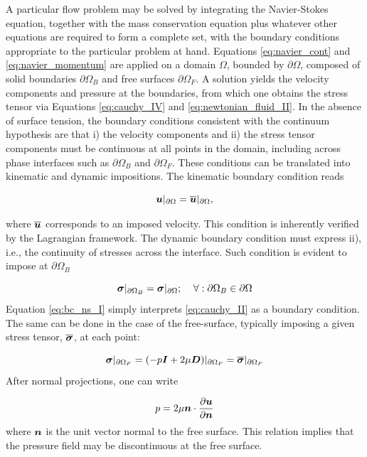 A particular flow problem may be solved by integrating the Navier-Stokes equation, together with the mass conservation equation plus whatever other equations are required to form a complete set, with the boundary conditions appropriate to the particular problem at hand. Equations \eqref{eq:navier_cont} and \eqref{eq:navier_momentum} are applied on a domain $\Omega$, bounded by $\partial\Omega$, composed of solid boundaries $\partial\Omega_B$ and free surfaces $\partial\Omega_F$. A solution yields the velocity components and pressure at the boundaries, from which one obtains the stress tensor via Equations \eqref{eq:cauchy_IV} and \eqref{eq:newtonian_fluid_II}.
In the absence of surface tension, the boundary conditions consistent with the continuum hypothesis are that i) the velocity components and ii) the stress tensor components must be continuous at all points in the domain, including across phase interfaces such as $\partial\Omega_B$ and $\partial\Omega_F$. These conditions can be translated into kinematic and dynamic impositions. The kinematic boundary condition reads

%
	\begin{equation} \label{eq:bc_kinematic}
		\boldsymbol{u}|_{\partial\Omega}=\overline{\boldsymbol{u}}|_{\partial\Omega},
	\end{equation}
%

where $\overline{\boldsymbol{u}}$ corresponds to an imposed velocity. This condition is inherently verified by the Lagrangian framework. The dynamic boundary condition must express ii), i.e., the continuity of stresses across the interface. Such condition is evident to impose at $\partial\Omega_B$

%
	\begin{equation} \label{eq:bc_ns_I}
		\boldsymbol{\sigma}|_{\partial\Omega_B}=\boldsymbol{\sigma}|_{\partial\Omega}; \;\;\;\;\forall: \partial\Omega_B \in \partial\Omega
	\end{equation}
%
Equation \eqref{eq:bc_ns_I} simply interprets \eqref{eq:cauchy_II} as a boundary condition. The same can be done in the case of the free-surface, typically imposing a given stress tensor, $\overline{\boldsymbol{\sigma}}$, at each point:

%
	\begin{equation} \label{eq:bc_ns_II}
		\boldsymbol{\sigma}|_{\partial\Omega_F}=(-p\boldsymbol{I}+ 2\mu\boldsymbol{D})|_{\partial\Omega_F}= \overline{\boldsymbol{\sigma}}|_{\partial\Omega_F}
	\end{equation}
%
After normal projections, one can write

%
	\begin{equation} \label{eq:bc_ns_III}
		p=2\mu \boldsymbol{n}\cdot\frac{\partial \boldsymbol{u}}{\partial\boldsymbol{n}}
	\end{equation}
%
where $\boldsymbol{n}$ is the unit vector normal to the free surface. This relation implies that the pressure field may be discontinuous at the free surface. 




